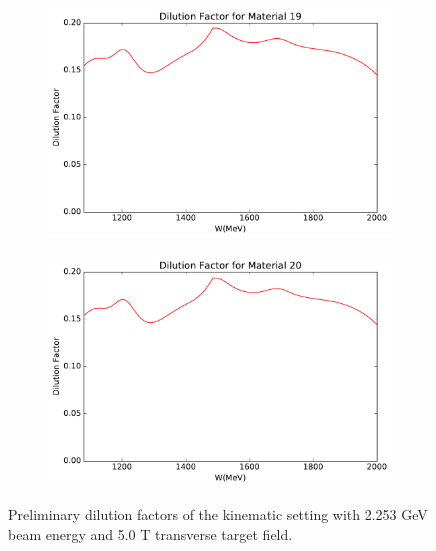 \begin{figure}[p!]
  \centering
  \begin{subfigure}[t]{0.49\textwidth}
    \includegraphics[width=\textwidth]{figs/dilution-22535090-19.pdf}
  \end{subfigure}
  \begin{subfigure}[t]{0.49\textwidth}
    \includegraphics[width=\textwidth]{figs/dilution-22535090-20.pdf}
  \end{subfigure}
  \caption[Dilution factors with $E=2.253$ GeV and $B=5.0$ T (transverse).]{Preliminary dilution factors of the kinematic setting with 2.253 GeV beam energy and 5.0 T transverse target field. \label{C7S4F5}}
\end{figure}


